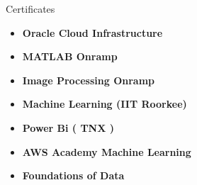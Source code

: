 \documentclass{resume} %
\begin{document}
\begin{rSection}{Certificates} 
\begin{itemize}
\item \textbf{Oracle Cloud Infrastructure}
\item \textbf{MATLAB Onramp}
\item \textbf{Image Processing Onramp}
\item \textbf{Machine Learning (IIT Roorkee) }
\item \textbf{Power Bi ( TNX ) }
\item \textbf{AWS Academy Machine Learning}
\item \textbf{Foundations of Data }
\end{itemize}                  
\end{rSection}
\end{document}
